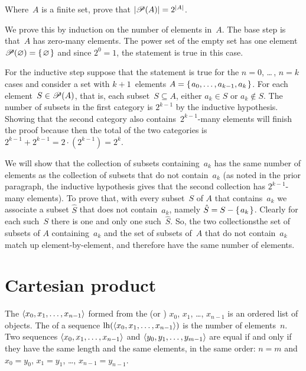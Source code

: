 \documentclass{ibl}
\begin{document}
\begin{ex}
Where~$A$ is a finite set, prove that $|\mathscr{P}(A)|=2^{|A|}$.    
\begin{ans}
We prove this by induction on the number of elements in~$A$.
The base step is that~$A$ has zero-many elements.
The power set of the empty set has
one element $\mathscr{P}(\varnothing)=\mbox{$\{\hspace{0.1em}\varnothing\hspace{0.1em}\}$}$ and
since $2^0=1$, the statement is true in this case. 

For the inductive step suppose that the statement is true for the 
$n=0$, \ldots\,, $n=k$ cases and consider a set
with $k+1$~elements
$A=\mbox{$\{\hspace{0.1em}a_0, \ldots, a_{k-1},a_k\hspace{0.1em}\}$}$.
For each element~$S\in\mathscr{P}(A)$, that is, each subset~$S\subseteq A$,
either $a_k\in S$ or $a_k\notin S$.
The number of subsets in the first category is $2^{k-1}$ by the inductive
hypothesis.
Showing that 
the second category also contains~$2^{k-1}$-many elements will finish the proof
because then
the total of the two categories is 
$2^{k-1}+2^{k-1}=2\cdot(2^{k-1})=2^k$.

We will show that the collection of subsets containing~$a_k$
has the same number of elements as the collection of subsets that do not
contain~$a_k$
(as noted in the prior paragraph, the inductive hypothesis gives that
the second collection has $2^{k-1}$-many elements).
To prove that, with every subset~$S$ of $A$ that contains~$a_k$ we associate
a subset $\hat{S}$ that does not contain~$a_k$,
namely $\hat{S}=S-\mbox{$\{\hspace{0.1em}a_k\hspace{0.1em}\}$}$.
Clearly for each such~$S$ there is one and only one such~$\hat{S}$.
So, the two collections\Dash the set of subsets of $A$ containing~$a_k$
and the set of subsets of~$A$ that do not contain~$a_k$\Dash match
up element-by-element, and therefore have the same number of elements.
\end{ans}
\end{ex}





\section{Cartesian product}

\begin{df}
The  $\langle x_0, x_1, \ldots, x_{n-1}\rangle$
formed from the  
(or ) $x_0$, $x_1$, \ldots, $x_{n-1}$ 
is an ordered list of objects.
The  of a sequence $\operatorname*{lh}(\langle x_0, x_1, \ldots, x_{n-1}\rangle)$
is the number of elements~$n$.
Two sequences $\langle x_0, x_1, \ldots, x_{n-1}\rangle$ and
$\langle y_0, y_1, \ldots, y_{m-1}\rangle$ are equal if and only if
they have the same length and
the same elements, in the same order:
$n=m$ and
$x_0=y_0$, $x_1=y_1$, \ldots, $x_{n-1}=y_{n-1}$. 
\end{df}
\end{document}
